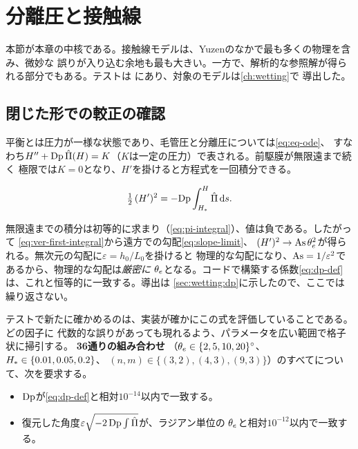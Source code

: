 \section{分離圧と接触線}
\label{sec:verification:disjoining}

本節が本章の中核である。接触線モデルは、Yuzenのなかで最も多くの物理を含み、微妙な
誤りが入り込む余地も最も大きい。一方で、解析的な参照解が得られる部分でもある。テストは
にあり、対象のモデルは\cref{ch:wetting}で
導出した。

\subsection{閉じた形での較正の確認}

平衡とは圧力が一様な状態であり、毛管圧と分離圧については\cref{eq:eq-ode}、
すなわち$H'' + \mathrm{Dp}\,\hat{\Pi}(H) = K$（$K$は一定の圧力）で表される。前駆膜が無限遠まで続く
極限では$K = 0$となり、$H'$を掛けると方程式を一回積分できる。

\begin{equation}\label{eq:ver-first-integral}
  \tfrac{1}{2}\,(H')^{2} = -\mathrm{Dp} \int_{H_{*}}^{H} \hat{\Pi}\,\mathrm{d}s .
\end{equation}

無限遠までの積分は初等的に求まり（\cref{eq:pi-integral}）、値は負である。したがって
\cref{eq:ver-first-integral}から遠方での勾配\cref{eq:slope-limit}、
$(H')^{2} \to \mathrm{As}\,\theta_{e}^{2}$が得られる。無次元の勾配に$\varepsilon = h_0/L_0$を掛けると
物理的な勾配になり、$\mathrm{As} = 1/\varepsilon^{2}$であるから、物理的な勾配は\emph{厳密に}
$\theta_{e}$となる。コードで構築する係数\cref{eq:dp-def}は、これと恒等的に一致する。導出は
\cref{sec:wetting:dp}に示したので、ここでは繰り返さない。

テストで新たに確かめるのは、実装が確かにこの式を評価していることである。どの因子に
代数的な誤りがあっても現れるよう、パラメータを広い範囲で格子状に掃引する。
\textbf{36通りの組み合わせ}
（$\theta_{e} \in \{2, 5, 10, 20\}^{\circ}$、$H_{*} \in \{0.01, 0.05, 0.2\}$、
$(n,m) \in \{(3,2), (4,3), (9,3)\}$）のすべてについて、次を要求する。

\begin{itemize}
  \item $\mathrm{Dp}$が\cref{eq:dp-def}と相対$10^{-14}$以内で一致する。
  \item 復元した角度$\varepsilon\sqrt{-2\,\mathrm{Dp}\int\hat{\Pi}}$が、ラジアン単位の
    $\theta_{e}$と相対$10^{-12}$以内で一致する。
\end{itemize}

